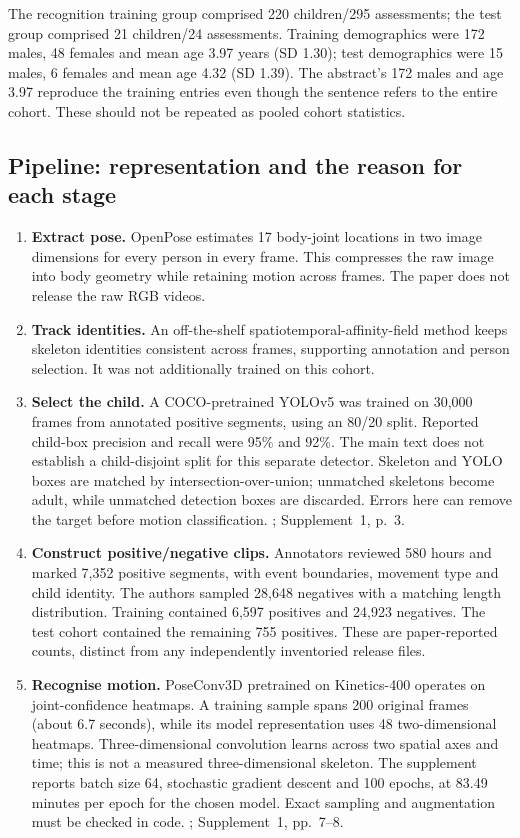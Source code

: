 The recognition training group comprised 220 children/295 assessments; the test group comprised 21 children/24 assessments. Training demographics were 172 males, 48 females and mean age 3.97 years (SD 1.30); test demographics were 15 males, 6 females and mean age 4.32 (SD 1.39). The abstract's 172 males and age 3.97 reproduce the training entries even though the sentence refers to the entire cohort. These should not be repeated as pooled cohort statistics. \cite[pp.~1,4]{barami2024}

\subsection{Pipeline: representation and the reason for each stage}
\begin{enumerate}[leftmargin=*]
\item \textbf{Extract pose.} OpenPose estimates 17 body-joint locations in two image dimensions for every person in every frame. This compresses the raw image into body geometry while retaining motion across frames. The paper does not release the raw RGB videos. \cite[pp.~3,9]{barami2024}
\item \textbf{Track identities.} An off-the-shelf spatiotemporal-affinity-field method keeps skeleton identities consistent across frames, supporting annotation and person selection. It was not additionally trained on this cohort. \cite[p.~3]{barami2024}
\item \textbf{Select the child.} A COCO-pretrained YOLOv5 was trained on 30,000 frames from annotated positive segments, using an 80/20 split. Reported child-box precision and recall were 95\% and 92\%. The main text does not establish a child-disjoint split for this separate detector. Skeleton and YOLO boxes are matched by intersection-over-union; unmatched skeletons become adult, while unmatched detection boxes are discarded. Errors here can remove the target before motion classification. \cite[pp.~3--4]{barami2024}; Supplement~1, p.~3.
\item \textbf{Construct positive/negative clips.} Annotators reviewed 580 hours and marked 7,352 positive segments, with event boundaries, movement type and child identity. The authors sampled 28,648 negatives with a matching length distribution. Training contained 6,597 positives and 24,923 negatives. The test cohort contained the remaining 755 positives. These are paper-reported counts, distinct from any independently inventoried release files. \cite[pp.~3--4]{barami2024}
\item \textbf{Recognise motion.} PoseConv3D pretrained on Kinetics-400 operates on joint-confidence heatmaps. A training sample spans 200 original frames (about 6.7 seconds), while its model representation uses 48 two-dimensional heatmaps. Three-dimensional convolution learns across two spatial axes and time; this is not a measured three-dimensional skeleton. The supplement reports batch size 64, stochastic gradient descent and 100 epochs, at 83.49 minutes per epoch for the chosen model. Exact sampling and augmentation must be checked in code. \cite[p.~4]{barami2024}; Supplement~1, pp.~7--8.

\end{enumerate}
